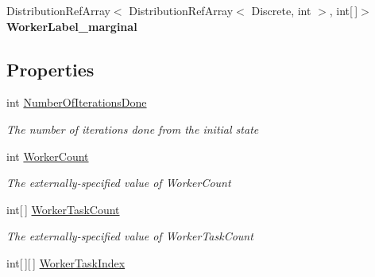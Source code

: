 \begin{DoxyCompactItemize}
\item 
\hypertarget{class_microsoft_research_1_1_infer_1_1_models_1_1_user_1_1_model___e_p_a8e3e8801f3d7aa01655a3ec06aaeb4b4}{}Distribution\+Ref\+Array$<$ Distribution\+Ref\+Array$<$ Discrete, int $>$, int\mbox{[}$\,$\mbox{]}$>$ {\bfseries Worker\+Label\+\_\+marginal}\label{class_microsoft_research_1_1_infer_1_1_models_1_1_user_1_1_model___e_p_a8e3e8801f3d7aa01655a3ec06aaeb4b4}

\end{DoxyCompactItemize}
\subsection*{Properties}
\begin{DoxyCompactItemize}
\item 
int \hyperlink{class_microsoft_research_1_1_infer_1_1_models_1_1_user_1_1_model___e_p_a0a9e34e70ccab7709f1134b9b5889a47}{Number\+Of\+Iterations\+Done}
\begin{DoxyCompactList}\small\item\em The number of iterations done from the initial state\end{DoxyCompactList}\item 
int \hyperlink{class_microsoft_research_1_1_infer_1_1_models_1_1_user_1_1_model___e_p_a918e710a2e7b4a123da74eced7421ece}{Worker\+Count}
\begin{DoxyCompactList}\small\item\em The externally-\/specified value of \textquotesingle{}Worker\+Count\textquotesingle{}\end{DoxyCompactList}\item 
int\mbox{[}$\,$\mbox{]} \hyperlink{class_microsoft_research_1_1_infer_1_1_models_1_1_user_1_1_model___e_p_adba9d5853dd6a6ab74401c6c4316d348}{Worker\+Task\+Count}
\begin{DoxyCompactList}\small\item\em The externally-\/specified value of \textquotesingle{}Worker\+Task\+Count\textquotesingle{}\end{DoxyCompactList}\item 
int\mbox{[}$\,$\mbox{]}\mbox{[}$\,$\mbox{]} \hyperlink{class_microsoft_research_1_1_infer_1_1_models_1_1_user_1_1_model___e_p_acabd7291b2d88f17a2df55a702f71e29}{Worker\+Task\+Index}

\end{DoxyCompactItemize}
